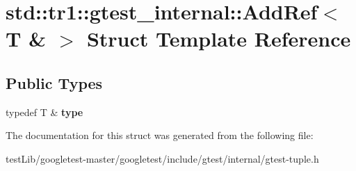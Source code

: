 \hypertarget{structstd_1_1tr1_1_1gtest__internal_1_1AddRef_3_01T_01_6_01_4}{}\section{std\+:\+:tr1\+:\+:gtest\+\_\+internal\+:\+:Add\+Ref$<$ T \& $>$ Struct Template Reference}
\label{structstd_1_1tr1_1_1gtest__internal_1_1AddRef_3_01T_01_6_01_4}
\subsection*{Public Types}
\begin{DoxyCompactItemize}
\item 
\mbox{\label{structstd_1_1tr1_1_1gtest__internal_1_1AddRef_3_01T_01_6_01_4_a9cb3b0992c2a9e7df42d01fb64c2dc88}} 
typedef T \& {\bfseries type}
\end{DoxyCompactItemize}


The documentation for this struct was generated from the following file\+:\begin{DoxyCompactItemize}
\item 
test\+Lib/googletest-\/master/googletest/include/gtest/internal/gtest-\/tuple.\+h\end{DoxyCompactItemize}
